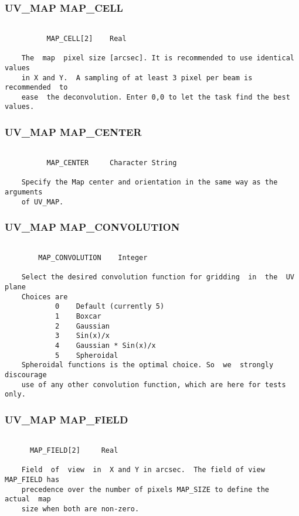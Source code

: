 \subsubsection{UV\_MAP MAP\_CELL}
\begin{verbatim}

          MAP_CELL[2]    Real

    The  map  pixel size [arcsec]. It is recommended to use identical values
    in X and Y.  A sampling of at least 3 pixel per beam is  recommended  to
    ease  the deconvolution. Enter 0,0 to let the task find the best values.

\end{verbatim}
\subsubsection{UV\_MAP MAP\_CENTER}
\begin{verbatim}

          MAP_CENTER     Character String

    Specify the Map center and orientation in the same way as the  arguments
    of UV_MAP.

\end{verbatim}
\subsubsection{UV\_MAP MAP\_CONVOLUTION}
\begin{verbatim}

        MAP_CONVOLUTION    Integer

    Select the desired convolution function for gridding  in  the  UV  plane
    Choices are
            0    Default (currently 5)
            1    Boxcar
            2    Gaussian
            3    Sin(x)/x
            4    Gaussian * Sin(x)/x
            5    Spheroidal
    Spheroidal functions is the optimal choice. So  we  strongly  discourage
    use of any other convolution function, which are here for tests only.

\end{verbatim}
\subsubsection{UV\_MAP MAP\_FIELD}
\begin{verbatim}

      MAP_FIELD[2]     Real

    Field  of  view  in  X and Y in arcsec.  The field of view MAP_FIELD has
    precedence over the number of pixels MAP_SIZE to define the  actual  map
    size when both are non-zero.

\end{verbatim}
